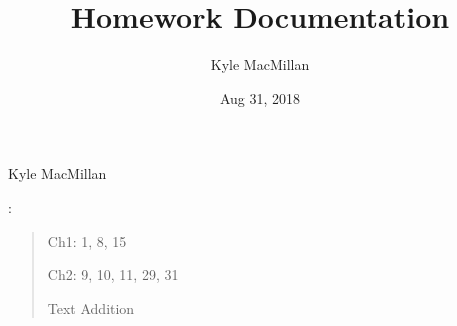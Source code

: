 \documentclass[letterpaper,10pt,english]{sphinxmanual}
\title{Homework Documentation}
\date{Aug 31, 2018}
\author{Kyle MacMillan}
\begin{document}
\maketitle
\sphinxtableofcontents
{}\label{\detokenize{index::doc}}



\chapter{}
\label{\detokenize{index:homework-1}}
Kyle MacMillan

:
\begin{quote}

Ch1: 1, 8, 15

Ch2: 9, 10, 11, 29, 31

Text Addition
\end{quote}
\end{document}
